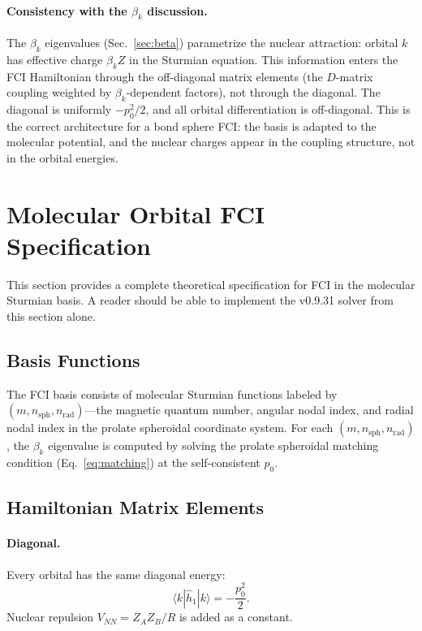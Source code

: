 \documentclass[aps,pra,twocolumn,superscriptaddress,longbibliography]{revtex4-2}
\begin{document}
\paragraph{Consistency with the $\beta_k$ discussion.}
The $\beta_k$ eigenvalues (Sec.~\ref{sec:beta}) parametrize the
nuclear attraction: orbital $k$ has effective charge $\beta_k Z$
in the Sturmian equation.  This information enters the FCI Hamiltonian
through the off-diagonal matrix elements (the $D$-matrix coupling
weighted by $\beta_k$-dependent factors), not through the diagonal.
The diagonal is uniformly $-p_0^2/2$, and all orbital differentiation
is off-diagonal.  This is the correct architecture for a bond sphere
FCI: the basis is adapted to the molecular potential, and the nuclear
charges appear in the coupling structure, not in the orbital energies.


\section{Molecular Orbital FCI Specification}
\label{sec:mo_fci}

This section provides a complete theoretical specification for FCI in
the molecular Sturmian basis.  A reader should be able to implement
the v0.9.31 solver from this section alone.

\subsection{Basis Functions}

The FCI basis consists of molecular Sturmian functions labeled by
$(m, n_{\text{sph}}, n_{\text{rad}})$---the magnetic quantum number,
angular nodal index, and radial nodal index in the prolate spheroidal
coordinate system.  For each $(m, n_{\text{sph}}, n_{\text{rad}})$,
the $\beta_k$ eigenvalue is computed by solving the prolate spheroidal
matching condition (Eq.~\eqref{eq:matching}) at the self-consistent
$p_0$.

\subsection{Hamiltonian Matrix Elements}

\paragraph{Diagonal.}
Every orbital has the same diagonal energy:
\begin{equation}
\langle k | \hat{h}_1 | k \rangle = -\frac{p_0^2}{2}.
\label{eq:mo_diag}
\end{equation}
Nuclear repulsion $V_{NN} = Z_A Z_B / R$ is added as a constant.
\end{document}
